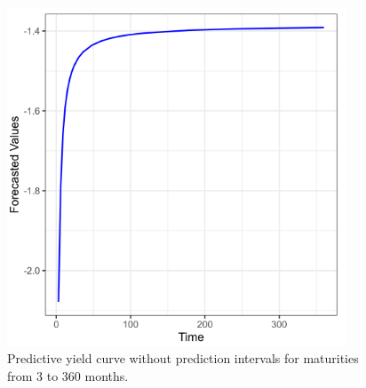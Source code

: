 \begin{figure}[h!]
    \centering
    \includegraphics[width=0.9\textwidth]{../figures/forecast_no_intervals.png}
    \caption{Predictive yield curve without prediction intervals for maturities from 3 to 360 months.}
\end{figure}